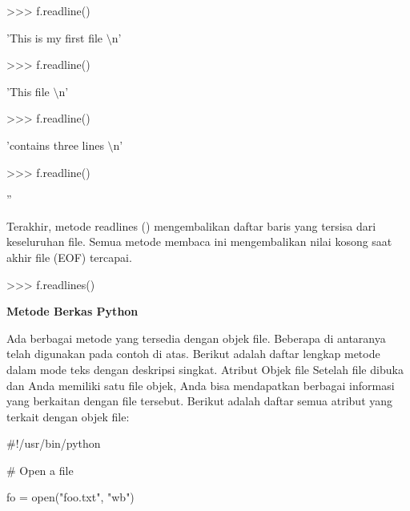 \vspace{12pt}
\noindent 
>>> f.readline() \par
\noindent 
'This is my first file $  \setminus  $n' \par
\vspace{12pt}
\noindent 
>>> f.readline() \par
\noindent 
'This file $  \setminus  $n' \par
\vspace{12pt}
\noindent 
>>> f.readline() \par
\noindent 
'contains three lines $  \setminus  $n' \par
\vspace{12pt}
\noindent 
>>> f.readline() \par
\noindent 
'' \par
\vspace{12pt}
Terakhir, metode readlines () mengembalikan daftar baris yang tersisa dari keseluruhan file. Semua metode membaca ini mengembalikan nilai kosong saat akhir file (EOF) tercapai. \par
\vspace{12pt}
\noindent 
>>> f.readlines() \par
{} \par
\vspace{12pt}
\vspace{12pt}
\noindent 
{\fontsize{14pt}{14pt}\selectfont \textbf{Metode Berkas Python} \\} \par
\vspace{12pt}
Ada berbagai metode yang tersedia dengan objek file. Beberapa di antaranya telah digunakan pada contoh di atas. Berikut adalah daftar lengkap metode dalam mode teks dengan deskripsi singkat. Atribut Objek file Setelah file dibuka dan Anda memiliki satu file objek, Anda bisa mendapatkan berbagai informasi yang berkaitan dengan file tersebut. Berikut adalah daftar semua atribut yang terkait dengan objek file: \par
\vspace{12pt}
\vspace{12pt}
\vspace{12pt}
\noindent 
$  \#  $!/usr/bin/python \par
\vspace{12pt}
\noindent 
$  \#  $ Open a file \par
\noindent 
fo = open("foo.txt", "wb") \par
